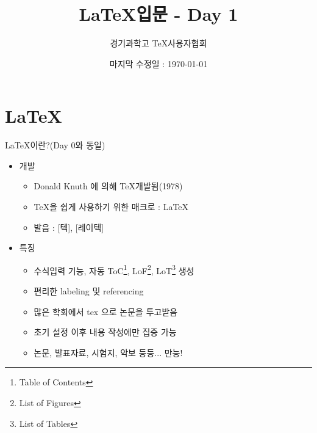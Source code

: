 \documentclass[12pt]{beamer}
\title[\LaTeX - Day 1]{\LaTeX 입문 - Day 1}
\author{경기과학고 \TeX 사용자협회}
\institute[GSHSTeXSociety]{\url{gshslatexintro.github.io}}
\date{마지막 수정일 : \today}
\begin{document}
\begin{frame}
\titlepage %
\end{frame}

\section{\LaTeX}
\begin{frame}{\LaTeX 이란?(Day 0와 동일)}
	\begin{itemize}
		\item 개발
		\begin{itemize}
			\item Donald Knuth 에 의해 \TeX 개발됨(1978)
			\item \TeX 을 쉽게 사용하기 위한 매크로 : \LaTeX
			\item 발음 : [텍], [레이텍]
		\end{itemize}
		\item 특징
		\begin{itemize}
			\item 수식입력 기능, 자동 ToC\footnote{Table of Contents}, LoF\footnote{List of Figures}, LoT\footnote{List of Tables} 생성
			\item 편리한 labeling 및 referencing
			\item 많은 학회에서 tex 으로 논문을 투고받음
			\item 초기 설정 이후 내용 작성에만 집중 가능
			\item 논문, 발표자료, 시험지, 악보 등등... 만능!
		\end{itemize}
	\end{itemize}
\end{frame}
\end{document}
